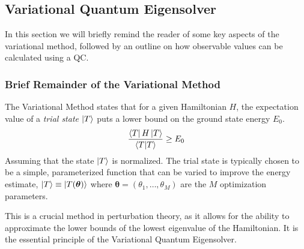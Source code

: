 \subsection{Variational Quantum Eigensolver}
In this section we will briefly remind the reader of some key aspects of the variational method, followed by an outline on how observable values can be calculated using a QC. 

\subsubsection{Brief Remainder of the Variational Method}
The Variational Method states that for a given Hamiltonian $H$, the expectation value of a \textit{trial state} $\ket{T}$ puts a lower bound on the ground state energy $E_0$.
\begin{equation}
    \frac{\bra{T}H\ket{T}}{\ip{T}} \geq E_0
\end{equation}
Assuming that the state $\ket{T}$ is normalized. The trial state is typically chosen to be a simple, parameterized function that can be varied to improve the energy estimate, $\ket{T}\equiv \ket{T(\boldsymbol{\theta})}$ where $\boldsymbol{\theta} = (\theta_1, \ldots, \theta_M)$ are the $M$ optimization parameters.

This is a crucial method in perturbation theory, as it allows for the ability to approximate the lower bounds of the lowest eigenvalue of the Hamiltonian. It is the essential principle of the Variational Quantum Eigensolver. 



